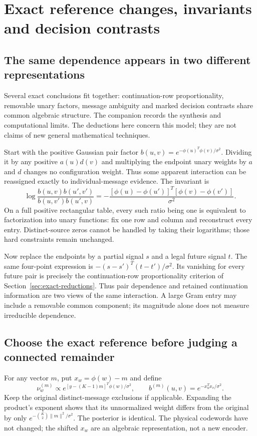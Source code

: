 \documentclass[10pt,a4paper]{article}
\begin{document}
\clearpage
\section{Exact reference changes, invariants and decision contrasts}
\label{sec:synthesis}
\subsection{The same dependence appears in two different representations}
Several exact conclusions fit together: continuation-row proportionality, removable unary factors,
message ambiguity and marked decision contrasts share common algebraic structure.
The companion  records the synthesis and computational limits.
The deductions here concern this model; they are not claims of new general mathematical techniques.

Start with the positive Gaussian pair factor $b(u,v)=e^{-\phi(u)^T\phi(v)/\sigma^2}$. Dividing it by any
positive $a(u)d(v)$ and multiplying the endpoint unary weights by $a$ and $d$ changes no configuration weight.
Thus some apparent interaction can be reassigned exactly to individual-message evidence. The invariant is
\begin{equation}
 \log\frac{b(u,v)b(u',v')}{b(u,v')b(u',v)}
 =-\frac{[\phi(u)-\phi(u')]^T[\phi(v)-\phi(v')]}{\sigma^2}.
 \label{eq:cross-ratio}
\end{equation}
On a full positive rectangular table, every such ratio being one is equivalent to factorization into unary
functions: fix one row and column and reconstruct every entry. Distinct-source zeros cannot be handled by
taking their logarithms; those hard constraints remain unchanged.

Now replace the endpoints by a partial signal $s$ and a legal future signal $t$. The same four-point expression
is $-(s-s')^T(t-t')/\sigma^2$. Its vanishing for every future pair is precisely the continuation-row
proportionality criterion of Section~\ref{sec:exact-reductions}. Thus pair dependence and retained continuation
information are two views of the same interaction. A large Gram entry may include a removable common component;
its magnitude alone does not measure irreducible dependence.

\subsection{Choose the exact reference before judging a connected remainder}
For any vector $m$, put $x_w=\phi(w)-m$ and define
\begin{equation}
 \nu_w^{(m)}\propto e^{[y-(K-1)m]^T\phi(w)/\sigma^2},\qquad
 b^{(m)}(u,v)=e^{-x_u^Tx_v/\sigma^2}.
 \label{eq:centred-reference}
\end{equation}
Keep the original distinct-message exclusions if applicable. Expanding the product's exponent shows that its
unnormalized weight differs from the original by only $e^{-\binom K2\|m\|^2/\sigma^2}$. The posterior is identical.
The physical codewords have not changed; the shifted $x_w$ are an algebraic representation, not a new encoder.
\end{document}
